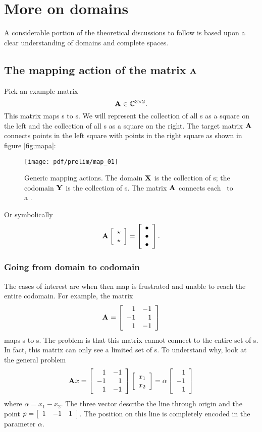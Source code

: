 \section{More on domains}
A considerable portion of the theoretical discussions to follow is based upon a clear understanding of domains and complete spaces. 

\subsection{The mapping action of the matrix $\A{}$}
Pick an example matrix 
\begin{equation}
  \A{}\in\cmplx{\by{3}{2}}.
\end{equation}
This matrix maps \vv s to \vvv s. We will represent the collection of all \vv s as a square on the left and the collection of all \vvv s as a square on the right. The target matrix $\A{}$ connects points in the left square with points in the right square as shown in figure \eqref{fig:mapa}:

\begin{figure}[htbp] %
   \centering
   \texttt{[image: pdf/prelim/map\_01]} 
   \caption{Generic mapping actions. The domain $\X{}$ is the collection of \vv s; the codomain $\Y{}$ is the collection of \vvv s. The matrix $\A{}$ connects each \vv \ to a \vvv.}
   \label{fig:mapa}
\end{figure}

Or symbolically
\begin{equation}
  \A{} \mat{c}{\star \\ \star} = \mat{c}{\bullet \\ \bullet \\ \bullet }.
\end{equation}

\subsubsection{Going from domain to codomain}
The cases of interest are when then map is frustrated and unable to reach the entire codomain. For example, the matrix 
\begin{equation}
  \A{}= \Aexample
  \label{eq:A}
\end{equation}
maps \vv s to \vvv s. The problem is that this matrix cannot connect to the entire set of \vvv s. In fact, this matrix can only see a limited set of \vvv s. To understand why, look at the general problem
\begin{equation}
  \A{} x = \Aexample \mat{c}{x_{1}\\x_{2}} = \alpha\mat{r}{1\\-1\\1}
\end{equation}
where $\alpha = x_{1}-x_{2}$. The three vector describe the line through origin and the point $p=\mat{ccc}{1&-1&1}$. The position on this line is completely encoded in the parameter $\alpha$.

